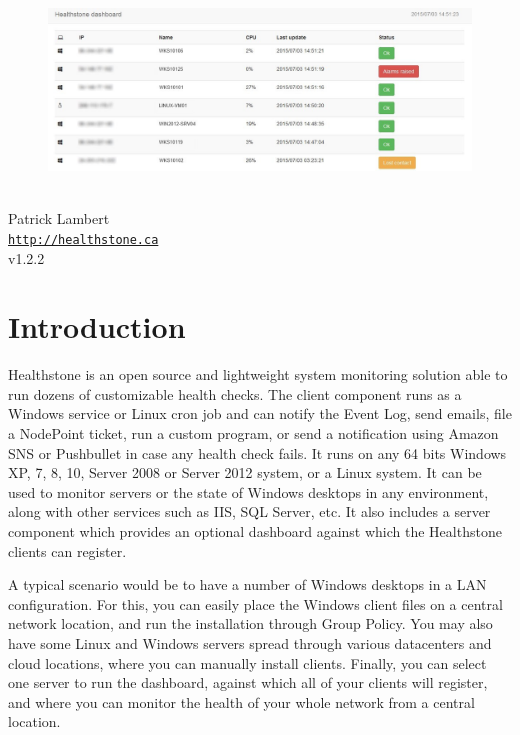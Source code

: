 \documentclass[11pt]{article}
\begin{document}
\begin{titlepage}
\bigskip
\begin{center}
\begin{figure}
\includegraphics[scale=0.6]{splash.jpg}
\end{figure}
\vspace*{1cm}
{
{\Huge \color{headings}{Healthstone Monitoring System}}\\
\bigskip
{\Large Patrick Lambert}\\
\texttt{\url{http://healthstone.ca}}\\
\bigskip
v1.2.2}
\vspace*{\fill}
\end{center}
\end{titlepage}

\tableofcontents

\newpage

\section{Introduction}

Healthstone is an open source and lightweight system monitoring solution able to run dozens of customizable health checks. The client component runs as a Windows service or Linux cron job and can notify the Event Log, send emails, file a NodePoint ticket, run a custom program, or send a notification using Amazon SNS or Pushbullet in case any health check fails. It runs on any 64 bits Windows XP, 7, 8, 10, Server 2008 or Server 2012 system, or a Linux system. It can be used to monitor servers or the state of Windows desktops in any environment, along with other services such as IIS, SQL Server, etc. It also includes a server component which provides an optional dashboard against which the Healthstone clients can register.

A typical scenario would be to have a number of Windows desktops in a LAN configuration. For this, you can easily place the Windows client files on a central network location, and run the installation through Group Policy. You may also have some Linux and Windows servers spread through various datacenters and cloud locations, where you can manually install clients. Finally, you can select one server to run the dashboard, against which all of your clients will register, and where you can monitor the health of your whole network from a central location.
\end{document}
